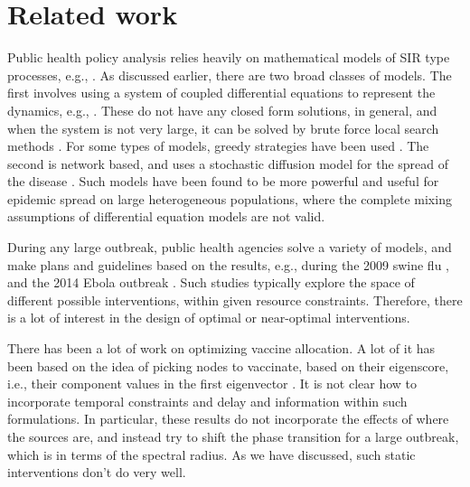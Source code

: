 \section{Related work}
\label{sec:related}

Public health policy analysis relies heavily on mathematical models of SIR type processes, e.g., \cite{lofgren:pnas14,anderson+m:book}. As discussed earlier, there are two broad classes of models. The first involves using a system of coupled differential equations to represent the dynamics, e.g., \cite{medlock:science09,AAAI1816714,venkataramanan:ichi17}. These do not have any closed form solutions, in general, and when the system is not very large, it can be solved by brute force local search methods \cite{medlock:science09}. For some types of models, greedy strategies have been used \cite{AAAI1816714,venkataramanan:ichi17}. 
The second is network based, and uses a stochastic diffusion model for the spread of the disease \cite{marathe:cacm13,halloran:pnas08,lofgren:pnas14,eubank:nature04,gk06}. Such models have been found to be more powerful and useful for epidemic spread on large heterogeneous populations, where the complete mixing assumptions of differential equation models are not valid.

During any large outbreak, public health agencies solve a variety of models, and make plans and guidelines based on the results,
e.g., during the 2009 swine flu \cite{medlock:science09}, and
the 2014 Ebola outbreak \cite{lofgren:pnas14}. Such studies typically explore the space of different possible interventions, within given resource constraints. Therefore, there is a lot of interest in the design of optimal or near-optimal interventions.

There has been a lot of work on optimizing vaccine allocation. A lot of it has been based on the idea of picking nodes to vaccinate, based on their eigenscore, i.e., their component values in the first eigenvector \cite{PreciadoVM13_2,PreciadoVM13,PreciadoVM14,SahaSDM15,Ogura2017,zhang2015controlling,YaoSDM2014}. It is not clear how to incorporate temporal constraints and delay and information within such formulations. In particular, these results do not incorporate the effects of where the sources are, and instead try to shift the phase transition for a large outbreak, which is in terms of the spectral radius. As we have discussed, such static interventions don't do very well.


